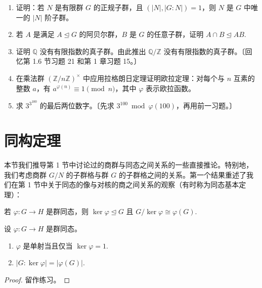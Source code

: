 \begin{enumerate}
\item 证明：若 \(N\) 是有限群 \(G\) 的正规子群，且 \((|N|, |G : N|) = 1\)，则 \(N\) 是 \(G\) 中唯一的 \(|N|\) 阶子群。

\item 若 \(A\) 是满足 \(A \trianglelefteq G\) 的阿贝尔群，\(B\) 是 \(G\) 的任意子群，证明 \(A \cap B \trianglelefteq AB\).

\item 证明 \(\mathbb{Q}\) 没有有限指数的真子群。由此推出 \(\mathbb{Q}/\mathbb{Z}\) 没有有限指数的真子群。〔回忆第 1.6 节习题 21 和第 1 章习题 15。〕

\item 在乘法群 \((\mathbb{Z}/n\mathbb{Z})^\times\) 中应用拉格朗日定理证明欧拉定理：对每个与 \(n\) 互素的整数 \(a\)，有 \(a^{\varphi(n)} \equiv 1 \pmod{n}\)，其中 \(\varphi\) 表示欧拉函数。

\item 求 \(3^{3^{100}}\) 的最后两位数字。〔先求 \(3^{100} \bmod \varphi(100)\)，再用前一习题。〕
\end{enumerate}

\section{同构定理}

本节我们推导第 1 节中讨论过的商群与同态之间关系的一些直接推论。特别地，我们考虑商群 \(G/N\) 的子群格与群 \(G\) 的子群格之间的关系。第一个结果重述了我们在第 1 节中关于同态的像与对核的商之间关系的观察（有时称为同态基本定理）：

\begin{theorem}[第一同构定理]\label{thm:3.16}
若 \(\varphi : G \to H\) 是群同态，则 \(\ker \varphi \trianglelefteq G\) 且 \(G/\ker \varphi \cong \varphi(G)\).
\end{theorem}

\begin{corollary}\label{cor:3.17}
设 \(\varphi : G \to H\) 是群同态。

\begin{enumerate}[label=(\arabic*)]
\item \(\varphi\) 是单射当且仅当 \(\ker \varphi = 1\).
\item \(|G : \ker \varphi| = |\varphi(G)|\).
\end{enumerate}
\end{corollary}

\begin{proof}
留作练习。
\end{proof}

